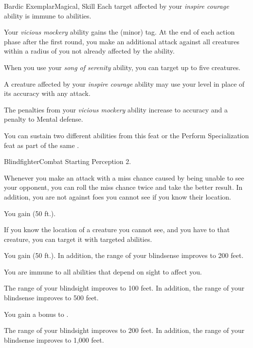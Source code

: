 \begin{feat}{Bardic Exemplar}{Magical, Skill}
         Each target affected by your \textit{inspire courage} ability is immune to  abilities.

         Your \textit{vicious mockery} ability gains the  (minor) tag.
        At the end of each action phase after the first round, you make an additional attack against all creatures within a \areahuge radius of you not already affected by the ability.

         When you use your \textit{song of serenity} ability, you can target up to five creatures.

         A creature affected by your \textit{inspire courage} ability may use your level in place of its accuracy with any attack.

         The penalties from your \textit{vicious mockery} ability increase to  accuracy and a  penalty to Mental defense.

         You can sustain two different  abilities from this feat or the Perform Specialization feat as part of the same .
    \end{feat}

    \begin{feat}{Blindfighter}{Combat}
        \featpre Starting Perception 2.
        
         Whenever you make an attack with a miss chance caused by being unable to see your opponent, you can roll the miss chance twice and take the better result.
        In addition, you are not  against foes you cannot see if you know their location.

         You gain  (50 ft.).

         If you know the location of a creature you cannot see, and you have  to that creature, you can target it with targeted abilities.

         You gain  (50 ft.).
        In addition, the range of your blindsense improves to 200 feet. 

         You are immune to all abilities that depend on sight to affect you.

         The range of your blindsight improves to 100 feet.
        In addition, the range of your blindsense improves to 500 feet.

         You gain a  bonus to .

         The range of your blindsight improves to 200 feet.
        In addition, the range of your blindsense improves to 1,000 feet.
    \end{feat}

